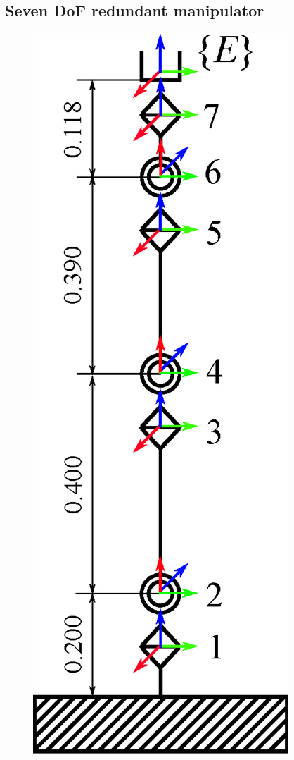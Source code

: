 \subsection{Seven DoF redundant manipulator}
%
\begin{figure}[t]
  \centering
  \begin{minipage}[h]{0.22\linewidth}
    \centering
    \includegraphics[width=1.0\linewidth]{fig/chapter6/results/spatial/model2.eps}

\end{minipage}
\end{figure}

